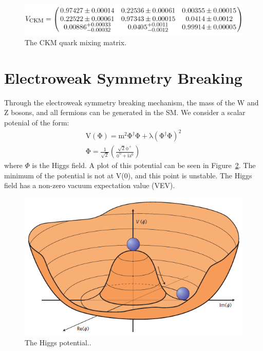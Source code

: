 \begin{figure}
\begin{center}
\includegraphics[width=1.0\linewidth]{figs/CKM.png}
\caption{The CKM quark mixing matrix.}
\label{figs:CKM}
\end{center}
\end{figure}



\section{Electroweak Symmetry Breaking}
Through the electroweak symmetry breaking mechanism, the mass of the W and Z bosons, and all fermions can be generated in the SM.  
We consider a scalar potenial of the form:
\begin{eqnarray}
\mathrm{ V(\Phi) = m^{2} \Phi^{\dagger} \Phi + \lambda ( \Phi^{\dagger} \Phi )^{2}  }\\
\mathrm{\Phi = \frac{1}{\sqrt{2}} \left( \frac{\sqrt{2} \phi^{+}}{\phi^{0} + ia^{0}}  \right)}
\end{eqnarray}  
where $\Phi$ is the Higgs field.  A plot of this potential can be seen in Figure~\ref{figs:higgspotential}.  
The minimum of the potential is not at V(0), and this point is unstable.  
The Higgs field has a non-zero vacuum expectation value (VEV).

\begin{figure}
\begin{center}
\includegraphics[width=0.7\linewidth]{figs/higgspotential.png}
\caption{The Higgs potential..}
\label{figs:higgspotential}
\end{center}
\end{figure}

